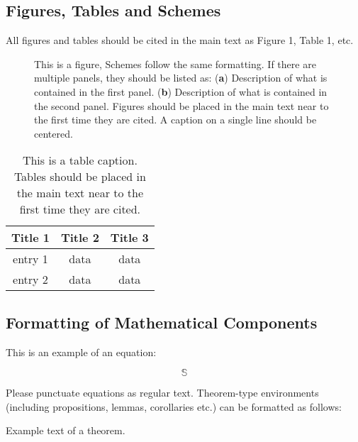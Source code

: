 \documentclass[journal,article,accept,oneauthors,pdftex,10pt,a4paper]{mdpi}
\begin{document}
\subsection{Figures, Tables and Schemes}

All figures and tables should be cited in the main text as Figure 1, Table 1, etc.

\begin{figure}[H]
\centering
\caption{This is a figure, Schemes follow the same formatting. If there are multiple panels, they should be listed as: (\textbf{a}) Description of what is contained in the first panel. (\textbf{b}) Description of what is contained in the second panel. Figures should be placed in the main text near to the first time they are cited. A caption on a single line should be centered.}
\end{figure}   

\begin{table}[H]
\caption{This is a table caption. Tables should be placed in the main text near to the first time they are cited.}
\centering
\begin{tabular}{ccc}
\toprule
\textbf{Title 1}	& \textbf{Title 2}	& \textbf{Title 3}\\
\midrule
entry 1		& data			& data\\
entry 2		& data			& data\\
\bottomrule
\end{tabular}
\end{table}

\subsection{Formatting of Mathematical Components}

This is an example of an equation:

\begin{equation}
\mathbb{S}
\end{equation}

Please punctuate equations as regular text. Theorem-type environments (including propositions, lemmas, corollaries etc.) can be formatted as follows:
\begin{Theorem}
Example text of a theorem.
\end{Theorem}
\end{document}
